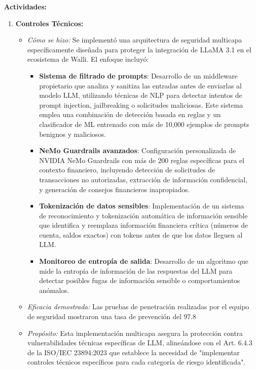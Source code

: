 \documentclass[12pt]{article}
\begin{document}
\textbf{Actividades:}
\begin{enumerate}
    \item \textbf{Controles Técnicos:}
        \begin{itemize}
            \item \textit{Cómo se hizo:} Se implementó una arquitectura de seguridad multicapa específicamente diseñada para proteger la integración de LLaMA 3.1 en el ecosistema de Walli. El enfoque incluyó:
            \begin{itemize}
                \item \textbf{Sistema de filtrado de prompts}: Desarrollo de un middleware propietario que analiza y sanitiza las entradas antes de enviarlas al modelo LLM, utilizando técnicas de NLP para detectar intentos de prompt injection, jailbreaking o solicitudes maliciosas. Este sistema emplea una combinación de detección basada en reglas y un clasificador de ML entrenado con más de 10,000 ejemplos de prompts benignos y maliciosos.
                \item \textbf{NeMo Guardrails avanzados}: Configuración personalizada de NVIDIA NeMo Guardrails con más de 200 reglas específicas para el contexto financiero, incluyendo detección de solicitudes de transacciones no autorizadas, extracción de información confidencial, y generación de consejos financieros inapropiados.
                \item \textbf{Tokenización de datos sensibles}: Implementación de un sistema de reconocimiento y tokenización automática de información sensible que identifica y reemplaza información financiera crítica (números de cuenta, saldos exactos) con tokens antes de que los datos lleguen al LLM.
                \item \textbf{Monitoreo de entropía de salida}: Desarrollo de un algoritmo que mide la entropía de información de las respuestas del LLM para detectar posibles fugas de información sensible o comportamientos anómalos.
            \end{itemize}
            \item \textit{Eficacia demostrada:} Las pruebas de penetración realizadas por el equipo de seguridad mostraron una tasa de prevención del 97.8%
            \item \textit{Propósito:} Esta implementación multicapa asegura la protección contra vulnerabilidades técnicas específicas de LLM, alineándose con el Art. 6.4.3 de la ISO/IEC 23894:2023 que establece la necesidad de "implementar controles técnicos específicos para cada categoría de riesgo identificada".

\end{itemize}
\end{enumerate}
\end{document}
